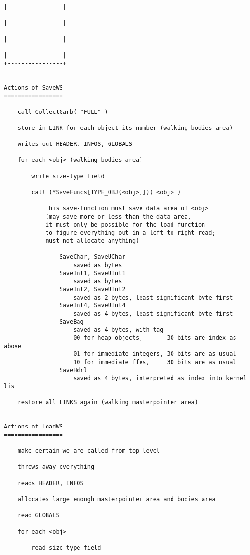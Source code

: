 \documentclass[11pt]{article}
\begin{document}
\begin{small}
\begin{verbatim}
|                |

|                |

|                |

|                |
+----------------+


Actions of SaveWS
=================

    call CollectGarb( "FULL" )

    store in LINK for each object its number (walking bodies area)

    writes out HEADER, INFOS, GLOBALS

    for each <obj> (walking bodies area)

        write size-type field

        call (*SaveFuncs[TYPE_OBJ(<obj>)])( <obj> )

            this save-function must save data area of <obj>
            (may save more or less than the data area,
            it must only be possible for the load-function
            to figure everything out in a left-to-right read;
            must not allocate anything)

                SaveChar, SaveUChar
                    saved as bytes
                SaveInt1, SaveUInt1
                    saved as bytes
                SaveInt2, SaveUInt2
                    saved as 2 bytes, least significant byte first
                SaveInt4, SaveUInt4
                    saved as 4 bytes, least significant byte first
                SaveBag
                    saved as 4 bytes, with tag
                    00 for heap objects,       30 bits are index as above
                    01 for immediate integers, 30 bits are as usual
                    10 for immediate ffes,     30 bits are as usual
                SaveHdrl
                    saved as 4 bytes, interpreted as index into kernel list

    restore all LINKS again (walking masterpointer area)


Actions of LoadWS
=================

    make certain we are called from top level

    throws away everything

    reads HEADER, INFOS

    allocates large enough masterpointer area and bodies area

    read GLOBALS

    for each <obj>

        read size-type field


\end{verbatim}
\end{small}
\end{document}
